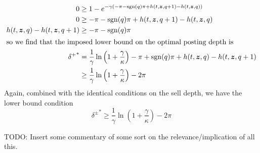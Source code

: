 \begin{align}
0 & \geq 1- e^{-\gamma(-\pi - \operatorname{\mathrm{sgn}}(q)\pi + h(t,\bm{z},q+1) - h(t,\bm{z},q)) } \\
0 & \geq -\pi - \operatorname{\mathrm{sgn}}(q)\pi + h(t,\bm{z},q+1) - h(t,\bm{z},q) \\
h(t,\bm{z},q) - h(t,\bm{z},q+1) & \geq -\pi - \operatorname{\mathrm{sgn}}(q)\pi \\
\intertext{so we find that the imposed lower bound on the optimal posting depth is}
{\delta^+}^* & = \frac{1}{\gamma} \ln \left( 1 + \frac{\gamma}{\kappa}\right) - \pi + \operatorname{\mathrm{sgn}}(q)\pi + h(t,\bm{z},q) - h(t,\bm{z},q+1) \nonumber \\
& \geq \frac{1}{\gamma} \ln \left( 1 + \frac{\gamma}{\kappa}\right) - 2\pi
\end{align}
Again, combined with the identical conditions on the sell depth, we have the lower bound condition
\begin{equation}
\label{eq:deltaslowerboundcase2}
\boxed{ {\delta^\pm}^* \geq \frac{1}{\gamma} \ln \left( 1 + \frac{\gamma}{\kappa}\right) - 2\pi }
\end{equation}

TODO: Insert some commentary of some sort on the relevance/implication of all this.


